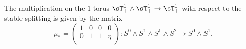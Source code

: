     \begin{lem}\label{lem_decomp_mult_2}\cite[Lemma 3.1]{carlsson2011higher}
      The multiplication on the $1$-torus $\sT^1_+ \wedge \sT^1_+ \to \sT^1_+$ with respect to the stable splitting is given by the matrix
      \begin{equation}\label{eq_torus_mult_2}\mu_* = %
        \left( \begin{array}{cccc}
          1 & 0 & 0 & 0 \\
          0 & 1 & 1 & \eta \\
        \end{array} \right): S^0 \wedge S^1 \wedge S^1 \wedge S^2 \to S^0 \wedge S^1 .\end{equation}
      \end{lem}
